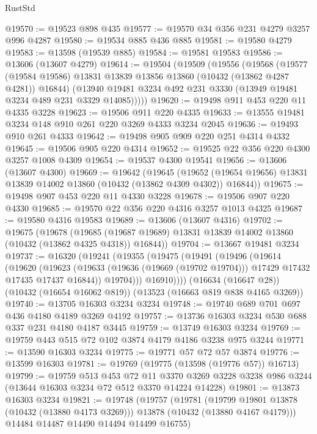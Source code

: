 \begin{lexlean}{RustStd}
\begin{coremodule}
@19570 := @19523 @898 @435
@19577 := @19570 @34 @356 @231 @4279 @3257 @996 @4287
@19580 := @19534 @885 @436 @885
@19581 := @19580 @4279
@19583 := @13598 (@19539 @885)
@19584 := @19581 @19583
@19586 := @13606 (@13607 @4279)
@19614 := @19504
    (@19509
      (@19556
        (@19568
          (@19577 (@19584 @19586) @13831 @13839 @13856 @13860 (@10432 (@13862 @4287 @4281)) @16844)
          (@13940 @19481 @3234 @492 @231 @3330 (@13949 @19481 @3234 @489 @231 @3329 @14085)))))
@19620 := @19498 @911 @453 @220 @11 @4335 @3228
@19623 := @19506 @911 @220 @4335
@19633 := @13555 @19481 @3234 @148 @910 @261 @220 @3269 @4333 @3234 @2045
@19636 := @19493 @910 @261 @4333
@19642 := @19498 @905 @909 @220 @251 @4314 @4332
@19645 := @19506 @905 @220 @4314
@19652 := @19525 @22 @356 @220 @4300 @3257 @1008 @4309
@19654 := @19537 @4300 @19541
@19656 := @13606 (@13607 @4300)
@19669 := @19642
    (@19645
      (@19652 (@19654 @19656) @13831 @13839 @14002 @13860 (@10432 (@13862 @4309 @4302)) @16844))
@19675 := @19498 @907 @453 @220 @11 @4330 @3228
@19678 := @19506 @907 @220 @4330
@19685 := @19570 @22 @356 @220 @4316 @3257 @1013 @4325
@19687 := @19580 @4316 @19583
@19689 := @13606 (@13607 @4316)
@19702 := @19675
    (@19678
      (@19685 (@19687 @19689) @13831 @13839 @14002 @13860 (@10432 (@13862 @4325 @4318)) @16844))
@19704 := @13667 @19481 @3234
@19737 := @16320
    (@19241
      (@19355
        (@19475
          (@19491
            (@19496
              (@19614
                (@19620
                  (@19623
                    (@19633 (@19636 (@19669 (@19702 @19704))) @17429 @17432 @17435 @17437 @16844))
                  @19704)))
            @16910))))
    (@16634 (@16647 @28))
    (@10432 (@16654 @16062 @819))
    (@13523 (@16663 @819 @838 @4165 @3269))
@19740 := @13705 @16303 @3234 @3234
@19748 := @19740 @689 @701 @697 @436 @4180 @4189 @3269 @4192
@19757 := @13736 @16303 @3234 @530 @688 @337 @231 @4180 @4187 @3445
@19759 := @13749 @16303 @3234
@19769 := @19759 @443 @515 @72 @102 @3874 @4179 @4186 @3238 @975 @3244
@19771 := @13590 @16303 @3234
@19775 := @19771 @57 @72 @57 @3874
@19776 := @13599 @16303
@19781 := @19769 (@19775 (@13598 (@19776 @57)) @16713)
@19799 := @19759
    @513
    @453
    @72
    @11
    @3370
    @3269
    @3228
    @3238
    @986
    @3244
    (@13644 @16303 @3234 @72 @512 @3370 @14224 @14228)
@19801 := @13873 @16303 @3234
@19821 := @19748
    (@19757
      (@19781
        (@19799 @19801 @13878 (@10432 (@13880 @4173 @3269)))
        @13878
        (@10432 (@13880 @4167 @4179)))
      @14484
      @14487
      @14490
      @14494
      @14499
      @16755)

\end{coremodule}
\end{lexlean}
